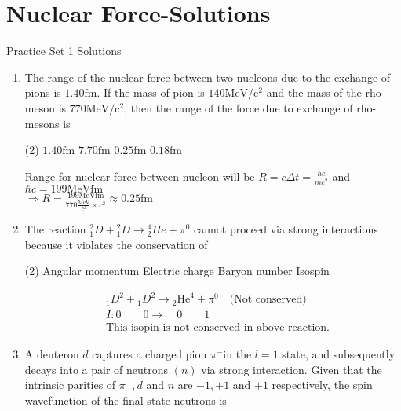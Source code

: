 \chapter{Nuclear Force-Solutions}
\begin{abox}
	Practice Set 1 Solutions
	\end{abox}
\begin{enumerate}
	\item The range of the nuclear force between two nucleons due to the exchange of pions is $1.40 \mathrm{fm}$. If the mass of pion is $140 \mathrm{MeV} / \mathrm{c}^{2}$ and the mass of the rho-meson is $770 \mathrm{MeV} / \mathrm{c}^{2}$, then the range of the force due to exchange of rho-mesons is
	{}
	\begin{tasks}(2)
		\task[\textbf{A.}] $1.40 \mathrm{fm}$
		\task[\textbf{B.}]$7.70 \mathrm{fm}$
		\task[\textbf{C.}]$0.25 \mathrm{fm}$
		\task[\textbf{D.}]$0.18 \mathrm{fm}$
	\end{tasks}
\begin{answer}
	Range for nuclear force between nucleon will be $R=c \Delta t=\frac{\hbar c}{m c^{2}}$ and $\hbar c=199 \mathrm{MeVfm}$\\
	$\Rightarrow R=\frac{199 \mathrm{MeVfm}}{770 \frac{\mathrm{MeV}}{c^{2}} \times c^{2}} \approx 0.25 \mathrm{fm}$
\end{answer}
	\item  The reaction ${ }_1^2 D+{ }_1^2 D \rightarrow{ }_2^4 H e+\pi^0$ cannot proceed via strong interactions because it violates the conservation of
	{}
	\begin{tasks}(2)
		\task[\textbf{a.}]Angular momentum
		\task[\textbf{b.}]Electric charge
		\task[\textbf{c.}]Baryon number
		\task[\textbf{d.}]Isospin 
	\end{tasks}
	\begin{answer}
		\begin{align*}
		&{ }_1 D^2+{ }_1 D^2 \rightarrow{ }_2 \mathrm{He}^4+\pi^0\quad
		\text{(Not conserved)}\\
		&I: 0 \qquad 0 \rightarrow\quad 0 \qquad 1\\
		&\text{This isopin is not conserved in above reaction.}
		\end{align*}
	\end{answer}
	\item  A deuteron $d$ captures a charged pion $\pi^{-}$in the $l=1$ state, and subsequently decays into a pair of neutrons $(n)$ via strong interaction. Given that the intrinsic parities of $\pi^{-}, d$ and $n$ are $-1,+1$ and $+1$ respectively, the spin wavefunction of the final state neutrons is

\end{enumerate}
